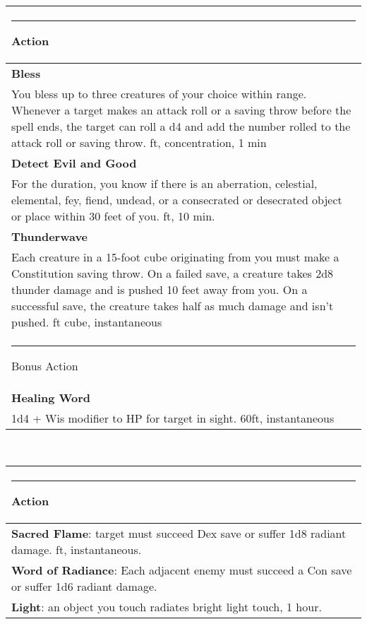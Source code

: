 \documentclass[twocolumn]{article}
\begin{document}
\\
\noindent\begin{tabular}{|m{3.1in}|}
\hline
\rule{1.25in}{0pt}Action\\
\hline
\textbf{Bless}\\
You bless up to three creatures of your choice within range. Whenever a target makes an attack roll or a saving throw before the spell ends, the target can roll a d4 and add the number rolled to the attack roll or saving throw.  {\sc 30 ft, concentration, 1 min}\\
\textbf{Detect Evil and Good}\\
For the duration, you know if there is an aberration, celestial, elemental, fey, fiend, undead, or a consecrated or desecrated object or place within 30 feet of you.  {\sc 30 ft, 10 min}.\\
\textbf{Thunderwave}\\
Each creature in a 15-foot cube originating from you must make a Constitution saving throw. On a failed save, a creature takes 2d8 thunder damage and is pushed 10 feet away from you. On a successful save, the creature takes half as much damage and isn't pushed. {\sc 15 ft cube, instantaneous}\\
\hline
\rule{1.1in}{0pt}Bonus Action\\
\hline
\textbf{Healing Word}\\
1d4  + Wis modifier to HP for target in sight. {\sc 60ft, instantaneous}\\
\hline
\end{tabular}
\vspace{8pt}

\\
\noindent\begin{tabular}{|m{3.1in}|}
\hline
\rule{1.25in}{0pt}Action\\
\hline
\textbf{Sacred Flame}: target must succeed Dex save or suffer 1d8 radiant damage. {\sc 60 ft, instantaneous.}\\
\hline
\textbf{Word of Radiance}: Each adjacent enemy must succeed a Con save or suffer 1d6 radiant damage.\\
\hline
\textbf{Light}: an object you touch radiates bright light {\sc touch, 1 hour.}\\
\hline
\end{tabular}
\vspace{8pt}
\end{document}
